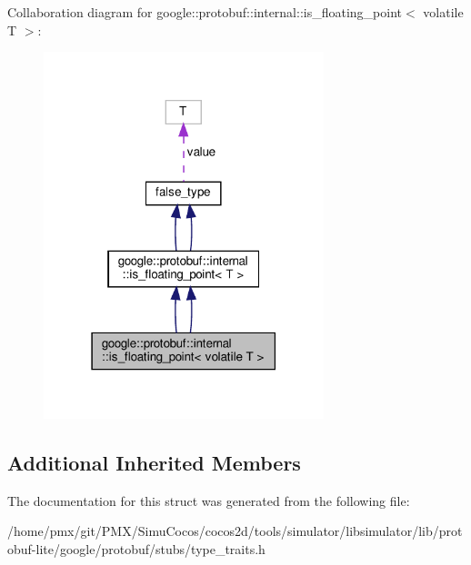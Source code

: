 Collaboration diagram for google\+:\+:protobuf\+:\+:internal\+:\+:is\+\_\+floating\+\_\+point$<$ volatile T $>$\+:
\nopagebreak
\begin{figure}[H]
\begin{center}
\leavevmode
\includegraphics[width=231pt]{structgoogle_1_1protobuf_1_1internal_1_1is__floating__point_3_01volatile_01T_01_4__coll__graph}
\end{center}
\end{figure}
\subsection*{Additional Inherited Members}


The documentation for this struct was generated from the following file\+:\begin{DoxyCompactItemize}
\item 
/home/pmx/git/\+P\+M\+X/\+Simu\+Cocos/cocos2d/tools/simulator/libsimulator/lib/protobuf-\/lite/google/protobuf/stubs/type\+\_\+traits.\+h\end{DoxyCompactItemize}
